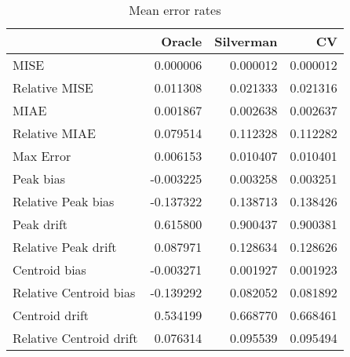 \begin{table}[H]
\centering
\begin{tabular}{lrrr}
  \hline
 & Oracle & Silverman & CV \\ 
  \hline
MISE & 0.000006 & 0.000012 & 0.000012 \\ 
  Relative MISE & 0.011308 & 0.021333 & 0.021316 \\ 
  MIAE & 0.001867 & 0.002638 & 0.002637 \\ 
  Relative MIAE & 0.079514 & 0.112328 & 0.112282 \\ 
  Max Error & 0.006153 & 0.010407 & 0.010401 \\ 
  Peak bias & -0.003225 & 0.003258 & 0.003251 \\ 
  Relative Peak bias & -0.137322 & 0.138713 & 0.138426 \\ 
  Peak drift & 0.615800 & 0.900437 & 0.900381 \\ 
  Relative Peak drift & 0.087971 & 0.128634 & 0.128626 \\ 
  Centroid bias & -0.003271 & 0.001927 & 0.001923 \\ 
  Relative Centroid bias & -0.139292 & 0.082052 & 0.081892 \\ 
  Centroid drift & 0.534199 & 0.668770 & 0.668461 \\ 
  Relative Centroid drift & 0.076314 & 0.095539 & 0.095494 \\ 
   \hline
\end{tabular}
\caption{Mean error rates} 
\label{tbl:mean_error_rates}
\end{table}
